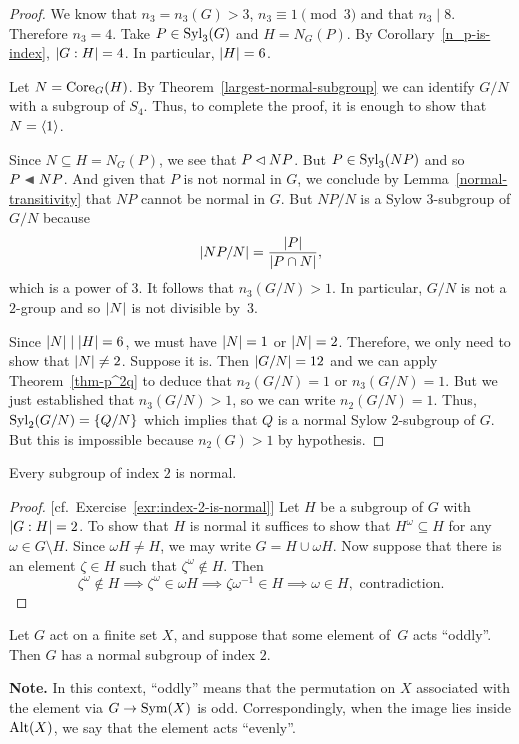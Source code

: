 \begin{proof} We know that $n_3=n_3(G)>3$, $n_3\equiv1\pmod3$ and that $n_3\mid 8$. Therefore $n_3=4$. Take $P\in{\rm Syl}_3(G)$ and $H=N_G(P)$. By Corollary~\ref{n_p-is-index}, $\left\vert{G:H}\right\vert=4$. In particular, $\left\vert{H}\right\vert=6$.

Let $N={\rm Core}_G(H)$. By Theorem~\ref{largest-normal-subgroup} we can identify $G/N$ with a subgroup of $S_4$. Thus, to complete the proof, it is enough to show that $N=\langle1\rangle$.

Since $N\subseteq H=N_G(P)$, we see that $P\lhd NP$. But $P\in{\rm Syl}_3(NP)$ and so $P\ch NP$. And given that $P$ is not normal in $G$, we conclude by Lemma~\ref{normal-transitivity} that $NP$ cannot be normal in $G$. But $NP/N$ is a Sylow $3$-subgroup of $G/N$ because
$$
    \left\vert{NP/N}\right\vert = \frac{\left\vert{P}\right\vert}{\left\vert{P\cap N}\right\vert},
$$
which is a power of $3$. It follows that $n_3(G/N)>1$. In particular, $G/N$ is not a $2$-group and so $\left\vert{N}\right\vert$ is not divisible by~$3$.

Since $\left\vert{N}\right\vert\mid\left\vert{H}\right\vert=6$, we must have $\left\vert{N}\right\vert=1$ or $\left\vert{N}\right\vert=2$. Therefore, we only need to show that $\left\vert{N}\right\vert\ne2$. Suppose it is. Then $\left\vert{G/N}\right\vert=12$ and we can apply Theorem~\ref{thm-p^2q} to deduce that $n_2(G/N)=1$ or $n_3(G/N)=1$. But we just established that $n_3(G/N)>1$, so we can write $n_2(G/N)=1$. Thus, ${\rm Syl}_2(G/N)=\{Q/N\}$ which implies that $Q$ is a normal Sylow $2$-subgroup of $G$. But this is impossible because $n_2(G)>1$ by hypothesis.  \end{proof}

\begin{lem}\label{index-2-is-normal}
    Every subgroup of index $2$ is normal.
\end{lem}

\begin{proof} {\rm[cf.~Exercise~\ref{exr:index-2-is-normal}]} Let $H$ be a subgroup of $G$ with $\left\vert{G:H}\right\vert=2$. To show that $H$ is normal it suffices to show that $H^\omega\subseteq H$ for any $\omega\in G\setminus H$. Since $\omega H\ne H$, we may write $G=H\cup\omega H$. Now suppose that there is an element $\zeta\in H$ such that $\zeta^\omega\notin H$. Then
$$
    \zeta^\omega\notin H\implies\zeta^\omega\in\omega H
        \implies\zeta\omega^{-1}\in H\implies \omega\in H,\text{ contradiction.}
$$
 \end{proof}

\begin{lem}
    Let\/ $G$ act on a finite set $X$, and suppose that some element of\/~$G$ acts ``oddly''. Then $G$ has a normal subgroup of index $2$.

    \textrm{\rm{\bf Note.} In this context, ``oddly'' means that the permutation on $X$ associated with the element via $G\to{\rm Sym}(X)$ is odd. Correspondingly, when the image lies inside ${\rm Alt}(X)$, we say that the element acts ``evenly''.}
\end{lem}

